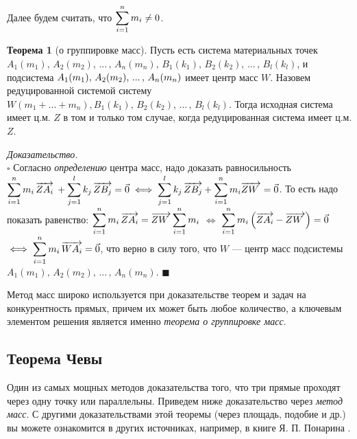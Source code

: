\documentclass[14pt]{extarticle}
\let\Overrightarrow\overrightarrow
\theoremstyle{definition}
\theoremstyle{theorem}
\newtheorem*{theorem}{Теорема}
\renewenvironment{proof}
    {\noindent \textit{Доказательство.}\\
	\indent $\square$}
	{ $\blacksquare$\\ }
\begin{document}
\noindent Далее будем считать, что $\mathlarger{\sum_{i=1}^{n} m_i \ne 0}$.

\begin{theorem}[о группировке масс]
Пусть есть система материальных точек $A_1(m_1),  \, A_2(m_2), \, ... \, ,
\, A_n(m_n), \, B_1(k_1), \, B_2(k_2), \, ... \, , \, B_l(k_l)$, 
	и подсистема $A_1(m_1), \\ \, A_2(m_2), \, ... \, , 
	\, A_n(m_n)$ имеет центр масс $W$.
Назовем редуцированной системой систему $W(m_1 + ... + m_n), B_1(k_1),
\, B_2(k_2), \, ... \, , \, B_l(k_l)$. Тогда исходная система имеет ц.м. $Z$
в том и только том случае, когда редуцированная система имеет ц.м. $Z$.
\end{theorem}



\begin{proof}
Согласно \textit{определению} центра масс, надо доказать равносильность\\
$\mathlarger{\sum_{i=1}^{n} m_i \, \Overrightarrow{ZA_i} \: + 
\sum_{j=1}^{l} k_j \, \Overrightarrow{ZB_j}} = \vec{0} \iff 
\mathlarger{\sum_{j=1}^{l} k_j \, \Overrightarrow{ZB_j} + 
	 \sum_{i=1}^{n} m_i  \Overrightarrow{ZW_{\: \,}}} = \vec{0}$.
То есть надо показать равенство:
$\mathlarger{\sum_{i=1}^{n} m_i \, \Overrightarrow{ZA_i} = 
\Overrightarrow{ZW_{\: \,}} \sum_{i=1}^{n} m_i}$ $\iff$   
$\mathlarger{\sum_{i=1}^{n}
m_i \, \Big(\Overrightarrow{ZA_i} - \Overrightarrow{ZW_{\: \,}}\Big)} = \vec{0}$ 
$\iff \mathlarger{\sum_{i=1}^{n}
m_i \, \Overrightarrow{WA_i}} = \vec{0}$, что верно в силу того, что $W$ ---
центр масс подсистемы $A_1(m_1), \, A_2(m_2), \, ... \, , \, A_n(m_n)$.
\end{proof}


Метод масс широко используется при доказательстве теорем и задач на
конкурентность прямых, причем их может быть любое количество, а ключевым 
элементом решения является именно \textit{теорема о группировке масс}. 


\subsection{Теорема Чевы} 

\indent Один из самых мощных методов доказательства того, что три прямые 
проходят через одну точку или параллельны. 
Приведем ниже доказательство через \textit{метод масс}.
С другими доказательствами этой теоремы (через площадь, подобие и др.) 
вы можете ознакомится в других источниках, например, в книге Я. П. Понарина
.\\
\end{document}

